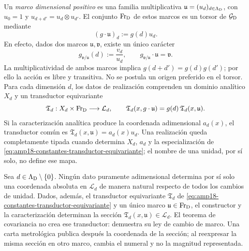 Un \emph{marco dimensional positivo} es una familia multiplicativa
\(\mathfrak u=(u_d)_{d\in\Lambda_{\rm D}}\), con
\(u_0=1\) y
\(u_{d+d'}=u_d\otimes u_{d'}\). El conjunto
\(\operatorname{Fr}_{\rm D}\) de estos marcos es un torsor de
\(\mathcal G_{\rm D}\) mediante
\begin{equation}
 \label{eq:amp18-constantes-torsor-marcos}
  (g\cdot\mathfrak u)_d:=g(d)u_d.
\end{equation}
En efecto, dados dos marcos \(\mathfrak u,\mathfrak v\), existe un único
carácter
\begin{equation}
 \label{eq:amp18-constantes-caracter-entre-marcos}
 g_{\mathfrak v/\mathfrak u}(d):=\frac{v_d}{u_d},
 \qquad
 g_{\mathfrak v/\mathfrak u}\cdot\mathfrak u=\mathfrak v.
\end{equation}
La multiplicatividad de ambos marcos implica
\(g(d+d')=g(d)g(d')\); por ello la acción es libre y transitiva. No se
postula un origen preferido en el torsor. Para cada dimensión
\(d\), los datos de realización comprenden un dominio
analítico \(X_d\) y un transductor equivariante
\begin{equation}
 \label{eq:amp18-constantes-transductor-equivariante}
 \mathfrak T_d:X_d\times\operatorname{Fr}_{\rm D}\longrightarrow
 \mathcal L_d,
 \qquad
 \mathfrak T_d(x,g\cdot\mathfrak u)
 =g(d)\,\mathfrak T_d(x,\mathfrak u).
\end{equation}
Si la caracterización analítica produce la coordenada adimensional
\(a_d(x)\), el transductor común es
\(\mathfrak T_d(x,\mathfrak u)=a_d(x)u_d\). Una realización queda
completamente tipada cuando determina \(X_d\), \(a_d\) y la
especialización de
\eqref{eq:amp18-constantes-transductor-equivariante}; el nombre de una
unidad, por sí solo, no define ese mapa.

\begin{theorem}
\label{thm:amp18-constantes-cuatro-estratos}
Sea \(d\in\Lambda_{\rm D}\setminus\{0\}\). Ningún dato puramente
adimensional determina por sí solo una coordenada absoluta en
\(\mathcal L_d\) de manera natural respecto de todos
los cambios de unidad. Dados, además, el transductor equivariante
\(\mathfrak T_d\) de
\eqref{eq:amp18-constantes-transductor-equivariante} y un único marco
\(\mathfrak u\in\operatorname{Fr}_{\rm D}\), el constructor y la
caracterización determinan la sección
\(\mathfrak T_d(x,\mathfrak u)\in\mathcal L_d\). El teorema de
covariancia no crea ese transductor: demuestra su ley de cambio de marco.
Una carta metrológica publica después la coordenada de la sección; al
reexpresar la misma sección en otro marco, cambia el numeral y no la
magnitud representada.
\end{theorem}

